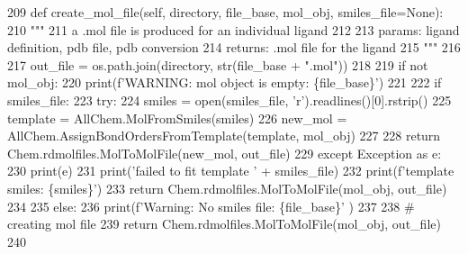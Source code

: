 \begin{DoxyCode}
209     \textcolor{keyword}{def }create\_mol\_file(self, directory, file\_base, mol\_obj, smiles\_file=None):
210         \textcolor{stringliteral}{"""}
211 \textcolor{stringliteral}{        a .mol file is produced for an individual ligand}
212 \textcolor{stringliteral}{}
213 \textcolor{stringliteral}{        params: ligand definition, pdb file, pdb conversion}
214 \textcolor{stringliteral}{        returns: .mol file for the ligand}
215 \textcolor{stringliteral}{        """}
216 
217         out\_file = os.path.join(directory, str(file\_base + \textcolor{stringliteral}{".mol"}))
218 
219         \textcolor{keywordflow}{if} \textcolor{keywordflow}{not} mol\_obj:
220             print(f\textcolor{stringliteral}{'WARNING: mol object is empty: \{file\_base\}'})
221 
222         \textcolor{keywordflow}{if} smiles\_file:
223             \textcolor{keywordflow}{try}:
224                 smiles = open(smiles\_file, \textcolor{stringliteral}{'r').readlines()[0].rstrip()}
225 \textcolor{stringliteral}{                template = AllChem.MolFromSmiles(smiles)}
226 \textcolor{stringliteral}{                new\_mol = AllChem.AssignBondOrdersFromTemplate(template, mol\_obj)}
227 \textcolor{stringliteral}{}
228 \textcolor{stringliteral}{                }\textcolor{keywordflow}{return} Chem.rdmolfiles.MolToMolFile(new\_mol, out\_file)
229             \textcolor{keywordflow}{except} Exception \textcolor{keyword}{as} e:
230                 print(e)
231                 print(\textcolor{stringliteral}{'failed to fit template '} + smiles\_file)
232                 print(f\textcolor{stringliteral}{'template smiles: \{smiles\}'})
233                 \textcolor{keywordflow}{return} Chem.rdmolfiles.MolToMolFile(mol\_obj, out\_file)
234 
235         \textcolor{keywordflow}{else}:
236             print(f\textcolor{stringliteral}{'Warning: No smiles file: \{file\_base\}'} )
237 
238         \textcolor{comment}{# creating mol file}
239         \textcolor{keywordflow}{return} Chem.rdmolfiles.MolToMolFile(mol\_obj, out\_file)
240 
\end{DoxyCode}
\mbox{\label{classfragalysis__api_1_1xcimporter_1_1conversion__pdb__mol_1_1_ligand_a1f1e4e6058646f97f6fba517f187b64c}} 
